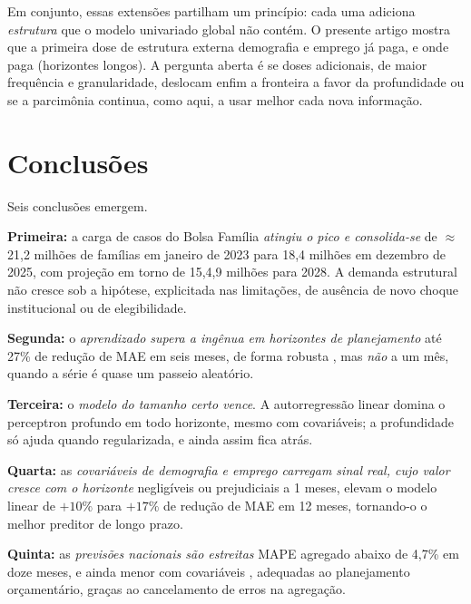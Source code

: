 \documentclass[12pt,a4paper,oneside]{article}
\begin{document}
Em conjunto, essas extensões partilham um princípio: cada uma adiciona
\emph{estrutura} que o modelo univariado global não contém. O presente
artigo mostra que a primeira dose de estrutura externa \textemdash{}
demografia e emprego \textemdash{} já paga, e onde paga (horizontes
longos). A pergunta aberta é se doses adicionais, de maior frequência e
granularidade, deslocam enfim a fronteira a favor da profundidade
\textemdash{} ou se a parcimônia continua, como aqui, a usar melhor cada
nova informação.

\section{Conclusões}
\label{sec:conclusoes}

Seis conclusões emergem.

\textbf{Primeira:} a carga de casos do Bolsa Família \emph{atingiu o pico e
consolida-se} \textemdash{} de $\approx$ 21,2 milhões de famílias em
janeiro de 2023 para 18,4 milhões em dezembro de 2025, com projeção em
torno de 15,4,9 milhões para 2028. A demanda estrutural não
cresce \textemdash{} sob a hipótese, explicitada nas limitações, de ausência
de novo choque institucional ou de elegibilidade.

\textbf{Segunda:} o \emph{aprendizado supera a ingênua em horizontes de
planejamento} \textemdash{} até 27\% de redução de MAE em seis meses, de
forma robusta \textemdash{}, mas \emph{não} a um mês, quando a série é
quase um passeio aleatório.

\textbf{Terceira:} o \emph{modelo do tamanho certo vence}. A autorregressão
linear domina o perceptron profundo em todo horizonte, mesmo com
covariáveis; a profundidade só ajuda quando regularizada, e ainda assim
fica atrás.

\textbf{Quarta:} as \emph{covariáveis de demografia e emprego carregam
sinal real, cujo valor cresce com o horizonte} \textemdash{} negligíveis ou
prejudiciais a 1 meses, elevam o modelo linear de $+10\%$ para
$+17\%$ de redução de MAE em 12 meses, tornando-o o melhor preditor de
longo prazo.

\textbf{Quinta:} as \emph{previsões nacionais são estreitas} \textemdash{}
MAPE agregado abaixo de 4,7\% em doze meses, e ainda menor com covariáveis
\textemdash{}, adequadas ao planejamento orçamentário, graças ao
cancelamento de erros na agregação.
\end{document}
